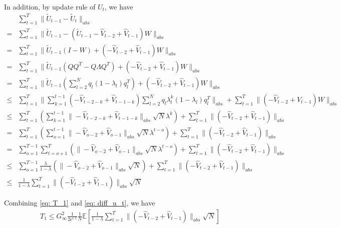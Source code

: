 \documentclass{article} %
\begin{document}
In addition, by update rule of $U_t$, we have 
\begin{align}\label{eq: diff_u_t}
& \sum_{t=1}^T   \|{{\tilde U_{t-1}}} - {{\tilde U_{t}}\|_{abs}} \nonumber \\
= &       \sum_{t=1}^T   \|{{\tilde U_{t-1}}} - (\tilde U_{t-1}  - \hat V_{t-2} + \hat V_{t-1})W \|_{abs}     \nonumber \\
= &    \sum_{t=1}^T   \|\tilde U_{t-1}(I-W)  + (- \hat V_{t-2} + \hat V_{t-1})W\|_{abs}     \nonumber \\
= &   \sum_{t=1}^T   \|\tilde U_{t-1}(QQ^T-Q\Lambda Q^T)  + (- \hat V_{t-2} + \hat V_{t-1})W \|_{abs}  \nonumber \\
= &  \sum_{t=1}^T   \|\tilde U_{t-1}(\sum_{l=2}^N q_l (1-\lambda_l)q_l^T)  + (- \hat V_{t-2} + \hat V_{t-1})W\|_{abs}    \nonumber \\
\leq &  \sum_{t=1}^T   \| \sum_{k=1}^{t-1} (- \hat V_{t-2-k} + \hat V_{t-1-k} ) \sum_{l=2}^N q_l \lambda_l^k  (1-\lambda_l)q_l^T  \|_{abs} + \sum_{t=1}^T  \| (- \hat V_{t-2} + \hat V_{t-1})W \|_{abs}     \nonumber \\
\leq &   \sum_{t=1}^T  \left(  \sum_{k=1}^{t-1} \|- \hat V_{t-2-k} + \hat V_{t-1-k}\|_{abs} \sqrt{N}\lambda^k \right)   + \sum_{t=1}^T  \| ( - \hat V_{t-2} + \hat V_{t-1}) \|_{abs}  \nonumber \\
=  &  \sum_{t=1}^T  \left(  \sum_{o=1}^{t-1} \|- \hat V_{o-2} + \hat V_{o-1}\|_{abs} \sqrt{N}\lambda^{t-o} \right)   + \sum_{t=1}^T  \| ( - \hat V_{t-2} + \hat V_{t-1}) \|_{abs}     \nonumber \\
=  &\sum_{o=1}^{T-1}  \sum_{t=o+1}^T  \left(   \|- \hat V_{o-2} + \hat V_{o-1}\|_{abs} \sqrt{N}\lambda^{t-o} \right)   + \sum_{t=1}^T  \| ( - \hat V_{t-2} + \hat V_{t-1}) \|_{abs}   \nonumber \\
\leq &\sum_{o=1}^{T-1} \frac{\lambda}{1-\lambda}   \left(   \|- \hat V_{o-2} + \hat V_{o-1}\|_{abs} \sqrt{N}  \right)   + \sum_{t=1}^T  \| ( - \hat V_{t-2} + \hat V_{t-1}) \|_{abs}   \nonumber \\
\leq & \frac{1}{1-\lambda}   \sum_{t=1}^T  \| ( - \hat V_{t-2} + \hat V_{t-1}) \|_{abs}  \sqrt{N}    
\end{align}

Combining \eqref{eq: T_1} and \eqref{eq: diff_u_t}, we have
\begin{align}
T_1 \leq G_{\infty}^2 \frac{1}{2\epsilon^{1.5}} \frac{1}{N}   \mathbb E \left [  \frac{1}{1-\lambda}   \sum_{t=1}^T  \| ( - \hat V_{t-2} + \hat V_{t-1}) \|_{abs}  \sqrt{N} \right]
\end{align}
\end{document}

